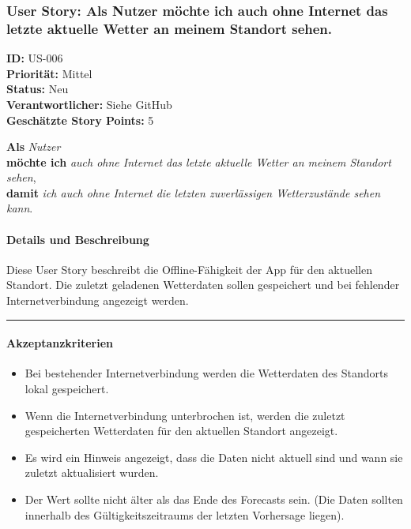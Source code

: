 \documentclass{article}
\begin{document}
\subsubsection{User Story: Als Nutzer möchte ich auch ohne Internet das letzte aktuelle Wetter an meinem Standort sehen.}
\textcolor{storyblue}{\textbf{ID:}} US-006 \\
\textcolor{storyblue}{\textbf{Priorität:}} Mittel \\
\textcolor{storyblue}{\textbf{Status:}} Neu \\
\textcolor{storyblue}{\textbf{Verantwortlicher:}} Siehe GitHub \\
\textcolor{storyblue}{\textbf{Geschätzte Story Points:}} 5

\vspace{0.5em}

\textcolor{storygreen}{\textbf{Als}} \textit{Nutzer} \\
\textcolor{storygreen}{\textbf{möchte ich}} \textit{auch ohne Internet das letzte aktuelle Wetter an meinem Standort sehen}, \\
\textcolor{storygreen}{\textbf{damit}} \textit{ich auch ohne Internet die letzten zuverlässigen Wetterzustände sehen kann}.

\vspace{1em}

\paragraph{Details und Beschreibung}
Diese User Story beschreibt die Offline-Fähigkeit der App für den aktuellen Standort. Die zuletzt geladenen Wetterdaten sollen gespeichert und bei fehlender Internetverbindung angezeigt werden.

\vspace{0.5em}
\hrule

\paragraph{Akzeptanzkriterien}
\begin{itemize}
    \item Bei bestehender Internetverbindung werden die Wetterdaten des Standorts lokal gespeichert.
    \item Wenn die Internetverbindung unterbrochen ist, werden die zuletzt gespeicherten Wetterdaten für den aktuellen Standort angezeigt.
    \item Es wird ein Hinweis angezeigt, dass die Daten nicht aktuell sind und wann sie zuletzt aktualisiert wurden.
    \item Der Wert sollte nicht älter als das Ende des Forecasts sein. (Die Daten sollten innerhalb des Gültigkeitszeitraums der letzten Vorhersage liegen).
\end{itemize}
\end{document}
